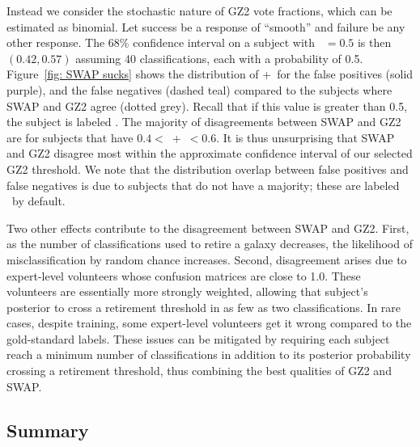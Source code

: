 Instead we consider the stochastic nature of GZ2 vote fractions, which can be estimated as binomial. Let success be a response of ``smooth'' and failure be any other response. The $68\%$ confidence interval on a subject with \fsmooth~$=0.5$ is then $(0.42, 0.57)$ assuming 40 classifications, each with a probability of 0.5. Figure~\ref{fig: SWAP sucks} shows the distribution of \ffeat+\fstar~for the false positives (solid purple), and the false negatives (dashed teal) compared to the  subjects where SWAP and GZ2 agree (dotted grey).  Recall that if this value is greater than 0.5, the subject is labeled \feat. The majority of disagreements between SWAP and GZ2 are for subjects that have $0.4 <$~\ffeat+\fstar~$< 0.6$. It is thus unsurprising that SWAP and GZ2 disagree most within the approximate confidence interval of our selected GZ2 threshold. We note that the distribution overlap between false positives and false negatives is due to subjects that do not have a majority; these are labeled \notfeat~by default. 

Two other effects contribute to the disagreement between SWAP and GZ2. First, as the number of classifications used to retire a galaxy decreases, the likelihood of misclassification by random chance increases. Second, disagreement arises due to expert-level volunteers whose confusion matrices are close to 1.0. These volunteers are essentially more strongly weighted, allowing that subject's posterior to cross a retirement threshold in as few as two classifications. In rare cases, despite training, some expert-level 
volunteers get it wrong compared to the gold-standard labels. These issues can be mitigated by requiring each subject reach a minimum number of classifications in addition to its posterior probability crossing a retirement threshold, thus combining the best qualities of GZ2 and SWAP. 


\subsection{Summary}



